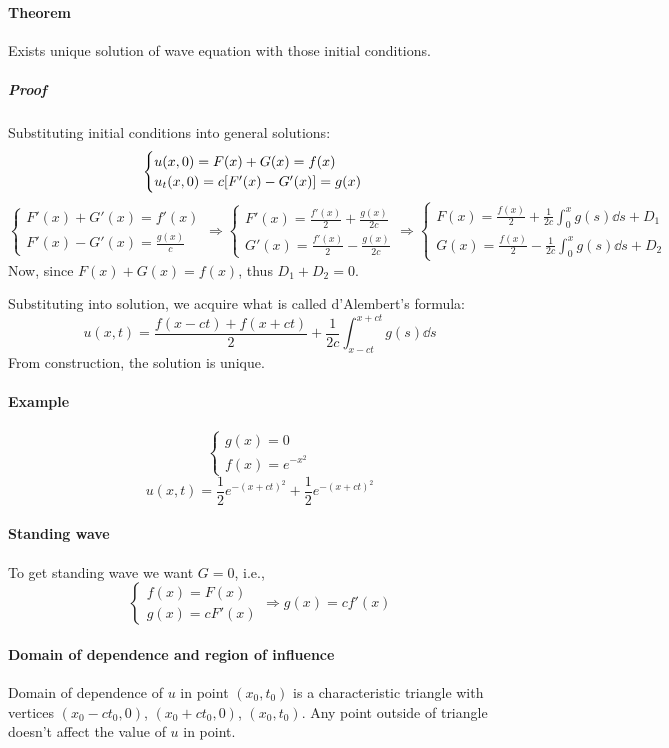 \paragraph{Theorem}
Exists unique solution of wave equation with those initial conditions. 
\subparagraph{Proof}
Substituting initial conditions into general solutions:
$$\begin{cases}
u(x,0) = F(x) + G(x) = f(x)\\
u_t(x,0) = c\qty[F'(x) - G'(x) ] = g(x)
\end{cases}$$
$$\begin{cases}
F'(x) + G'(x) = f'(x)\\
F'(x) - G'(x)  = \frac{g(x)}{c}
\end{cases} \Rightarrow \begin{cases}
F'(x) = \frac{f'(x) }{2} + \frac{g(x)}{2c}\\
G'(x)  = \frac{f'(x) }{2} - \frac{g(x)}{2c}
\end{cases} \Rightarrow \begin{cases}
F(x) = \frac{f(x) }{2} + \frac{1}{2c}\int_0^x g(s) \dd{s} + D_1\\
G(x)  = \frac{f(x) }{2} - \frac{1}{2c}\int_0^x g(s) \dd{s} + D_2
\end{cases}$$
Now, since $F(x)+G(x) = f(x)$, thus $D_1 + D_2 = 0$.

Substituting into solution, we acquire what is called d'Alembert's formula:
$$u(x,t) = \frac{f(x-ct) + f(x+ct) }{2} + \frac{1}{2c}\int_{x-ct}^{x+ct} g(s) \dd{s} $$
From construction, the solution is unique.
\paragraph{Example}
$$\begin{cases}
g(x) = 0 \\
f(x) = e^{-x^2}
\end{cases}$$
$$u(x,t) = \frac{1}{2} e^{-(x+ct)^2} + \frac{1}{2}e^{-(x+ct)^2} $$
\paragraph{Standing wave}
To get standing wave we want $G=0$, i.e., 
$$\begin{cases}
f(x) = F(x)\\
g(x) = cF'(x)
\end{cases} \Rightarrow g(x) = cf'(x)$$
\paragraph{Domain of dependence and region of influence}
Domain of dependence of $u$ in point $(x_0,t_0)$ is a characteristic triangle with vertices $(x_0-ct_0,0)$, $(x_0+ct_0, 0)$, $(x_0,t_0)$. Any point outside of triangle doesn't affect the value of $u$ in point.

